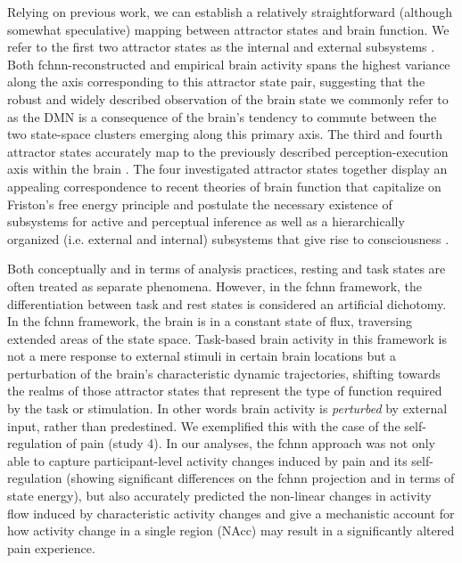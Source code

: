\documentclass{article}
\begin{document}
Relying on previous work, we can establish a relatively straightforward (although somewhat speculative) mapping between attractor states and brain function. We refer to the first two attractor states as the internal and external subsystems \citep{golland2008data, cioli2014differences}. Both \acrshort{fchnn}-reconstructed and empirical brain activity spans the highest variance along the axis corresponding to this attractor state pair, suggesting that the robust and widely described observation of the brain state we commonly refer to as the DMN is a consequence of the brain's tendency to commute between the two state-space clusters emerging along this primary axis.
The third and fourth attractor states accurately map to the previously described perception-execution axis within the brain \citep{fuster2004upper}. The four investigated attractor states together display an appealing correspondence to recent theories of brain function that capitalize on Friston's free energy principle \citep{friston2006free} and postulate the necessary existence of subsystems for active and perceptual inference \citep{friston2023free} as well as a hierarchically organized (i.e. external and internal) subsystems that give rise to consciousness \citep{ramstead2023inner}.

Both conceptually and in terms of analysis practices, resting and task states are often treated as separate phenomena. However, in the \acrshort{fchnn} framework, the differentiation between task and rest states is considered an artificial dichotomy.
In the \acrshort{fchnn} framework, the brain is in a constant state of flux, traversing extended areas of the state space. Task-based brain activity in this framework is not a mere response to external stimuli in certain brain locations but a perturbation of the brain's characteristic dynamic trajectories, shifting towards the realms of those attractor states that represent the type of function required by the task or stimulation. In other words brain activity is \textit{perturbed} by external input, rather than predestined. We exemplified this with the case of the self-regulation of pain (study 4).
In our analyses, the \acrshort{fchnn} approach was not only able to capture participant-level activity changes induced by pain and its self-regulation (showing significant differences on the \acrshort{fchnn} projection and in terms of state energy), but also accurately predicted the non-linear changes in activity flow induced by characteristic activity changes and give a mechanistic account for how activity change in a single region (NAcc) may result in a significantly altered pain experience.
\end{document}
